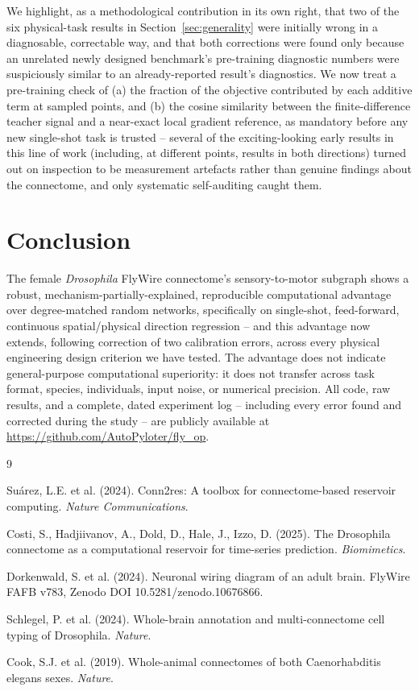 \documentclass[11pt]{article}
\begin{document}
We highlight, as a methodological contribution in its own right, that
two of the six physical-task results in Section~\ref{sec:generality}
were initially wrong in a diagnosable, correctable way, and that both
corrections were found only because an unrelated newly designed
benchmark's pre-training diagnostic numbers were suspiciously similar to
an already-reported result's diagnostics. We now treat a pre-training
check of (a) the fraction of the objective contributed by each additive
term at sampled points, and (b) the cosine similarity between the
finite-difference teacher signal and a near-exact local gradient
reference, as mandatory before any new single-shot task is trusted --
several of the exciting-looking early results in this line of work
(including, at different points, results in both directions) turned out
on inspection to be measurement artefacts rather than genuine findings
about the connectome, and only systematic self-auditing caught them.

\section{Conclusion}

The female \emph{Drosophila} FlyWire connectome's sensory-to-motor
subgraph shows a robust, mechanism-partially-explained, reproducible
computational advantage over degree-matched random networks, specifically
on single-shot, feed-forward, continuous spatial/physical direction
regression -- and this advantage now extends, following correction of
two calibration errors, across every physical engineering design
criterion we have tested. The advantage does not indicate general-purpose
computational superiority: it does not transfer across task format,
species, individuals, input noise, or numerical precision. All code, raw
results, and a complete, dated experiment log -- including every error
found and corrected during the study -- are publicly available at
\url{https://github.com/AutoPyloter/fly_op}.


\begin{thebibliography}{9}

Suárez, L.E. et al. (2024).
Conn2res: A toolbox for connectome-based reservoir computing.
\emph{Nature Communications}.

Costi, S., Hadjiivanov, A., Dold, D., Hale, J., Izzo, D. (2025).
The Drosophila connectome as a computational reservoir for time-series
prediction. \emph{Biomimetics}.

Dorkenwald, S. et al. (2024).
Neuronal wiring diagram of an adult brain.
FlyWire FAFB v783, Zenodo DOI 10.5281/zenodo.10676866.

Schlegel, P. et al. (2024).
Whole-brain annotation and multi-connectome cell typing of Drosophila.
\emph{Nature}.

Cook, S.J. et al. (2019).
Whole-animal connectomes of both Caenorhabditis elegans sexes.
\emph{Nature}.

\end{thebibliography}
\end{document}
